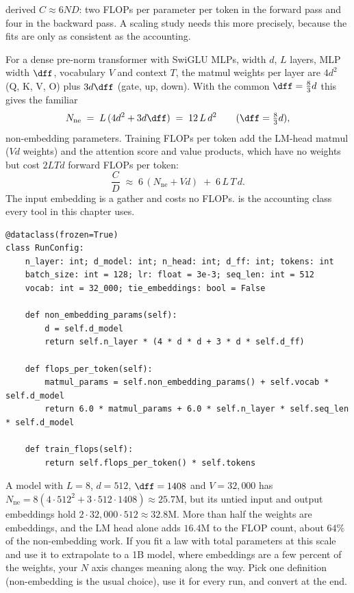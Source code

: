  derived $C\approx 6ND$: two FLOPs per parameter per token in the
forward pass and four in the backward pass. A scaling study needs this more precisely, because
the fits are only as consistent as the accounting.

For a dense pre-norm transformer with SwiGLU MLPs, width $d$, $L$ layers, MLP width $\dff$,
vocabulary $V$ and context $T$, the matmul weights per layer are $4d^2$ (Q, K, V, O) plus
$3d\dff$ (gate, up, down). With the common $\dff = \tfrac83 d$ this gives the familiar
\begin{equation}
N_{\text{ne}} \;=\; L\,(4d^2 + 3d\dff) \;=\; 12\,L\,d^2 \qquad(\dff=\tfrac83d),
\label{eq:scalinglaws:12ld2}
\end{equation}
non-embedding parameters. Training FLOPs per token add the LM-head matmul ($Vd$ weights) and the
attention score and value products, which have no weights but cost $2LTd$ forward FLOPs per
token:
\begin{equation}
\frac{C}{D} \;\approx\; 6\,(N_{\text{ne}} + Vd) \;+\; 6\,L\,T\,d.
\label{eq:scalinglaws:fpt}
\end{equation}
The input embedding is a gather and costs no FLOPs.  is the
accounting class every tool in this chapter uses.

\begin{lstlisting}[caption={Accounting for one run (from \code{llmsys/scaling.py}). Everything in this chapter---planning, fitting, the synthetic API---derives $N$ and $C$ from this one place.},label={lst:scalinglaws:runconfig}]
@dataclass(frozen=True)
class RunConfig:
    n_layer: int; d_model: int; n_head: int; d_ff: int; tokens: int
    batch_size: int = 128; lr: float = 3e-3; seq_len: int = 512
    vocab: int = 32_000; tie_embeddings: bool = False

    def non_embedding_params(self):
        d = self.d_model
        return self.n_layer * (4 * d * d + 3 * d * self.d_ff)

    def flops_per_token(self):
        matmul_params = self.non_embedding_params() + self.vocab * self.d_model
        return 6.0 * matmul_params + 6.0 * self.n_layer * self.seq_len * self.d_model

    def train_flops(self):
        return self.flops_per_token() * self.tokens
\end{lstlisting}

\begin{napkinmath}
A model with $L=8$, $d=512$, $\dff=1408$ and $V=32{,}000$ has
$N_{\text{ne}} = 8(4\cdot512^2 + 3\cdot512\cdot1408) \approx 25.7$M, but its untied input
and output embeddings hold $2\cdot32{,}000\cdot512\approx 32.8$M. More than half the weights
are embeddings, and the LM head alone adds $16.4$M to the FLOP count, about $64\%$ of the
non-embedding work. If you fit a law with total parameters at this scale and use it to
extrapolate to a 1B model, where embeddings are a few percent of the weights, your $N$ axis
changes meaning along the way. Pick one definition (non-embedding is the usual choice), use it
for every run, and convert at the end.
\end{napkinmath}

